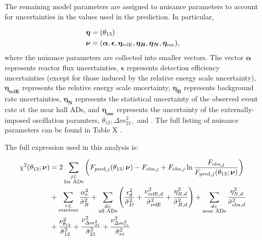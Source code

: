 The remaining model parameters
are assigned to nuisance parameters
to account for uncertainties in the values used in the prediction.
In particular,

\begin{align}
    \begin{split}
        \boldsymbol{\eta} &= (\theta_{13}) \\
        \boldsymbol{\nu} &= (
            \boldsymbol{\alpha},
            \boldsymbol{\epsilon},
            \boldsymbol{\eta_{\text{relE}}},
            \boldsymbol{\eta_B},
            \boldsymbol{\eta_N},
            \boldsymbol{\eta_{\text{osc}}}),
    \end{split}
\end{align}
where the nuisance parameters are collected into smaller vectors.
The vector $\boldsymbol{\alpha}$ represents reactor flux uncertainties,
$\boldsymbol{\epsilon}$ represents detection efficiency uncertainties
(except for those induced by the relative energy scale uncertainty),
$\boldsymbol{\eta_{\text{relE}}}$ represents the relative energy scale uncertainty,
$\boldsymbol{\eta_B}$ represents background rate uncertainties,
$\boldsymbol{\eta_N}$ represents the statistical uncertainty
of the observed event rate at the near hall ADs,
and $\boldsymbol{\eta_{\text{osc}}}$ represents the uncertainty
of the externally-imposed oscillation paramters, $\theta_{12}, \Delta m^2_{21},$
and \dmee{}.
The full listing of nuisance parameters
can be found in Table X .

The full \chisquare{} expression used in this analysis is:

\begin{align}
    \begin{split}
        \chi^2(\theta_{13};\boldsymbol{\nu}) &=
            2\sum_{\substack{j \in \\\text{far ADs}}}
        \left(
            F_{\text{pred},j}(\theta_{13};\boldsymbol{\nu}) - F_{\text{obs},j}
            + F_{\text{obs},j}\ln
            \frac{F_{\text{obs},j}}{F_{\text{pred},j}(\theta_{13};\boldsymbol{\nu})}
        \right) \\
            &+ \sum_{\substack{r \in \\\text{reactors}}}
                \frac{\alpha_r^2}{\tilde{\sigma}_R^2}
            + \sum_{\substack{d \in \\\text{all ADs}}}
            \left(
                \frac{\epsilon_d^2}{\tilde{\sigma}_D^2}
                + \frac{\nu_{\text{relE},d}^2}{\tilde{\sigma}_{\text{relE}}^2}
                + \frac{\eta_{B,d}^2}{\tilde{\sigma}_{B,d}^2}
            \right)
            + \sum_{\substack{d \in \\\text{near ADs}}}
            \frac{\eta_{N,d}^2}{\tilde{\sigma}^2_{\text{obs},d}} \\
            &+ \frac{\nu_{\theta_{12}}^2}{\tilde{\sigma}_{12}^2}
            + \frac{\nu_{\Delta m^2_{21}}^2}{\tilde{\sigma}_{21}^2}
            + \frac{\nu_{\Delta m^2_{ee}}^2}{\tilde{\sigma}_{ee}^2}
    \end{split}
\end{align}

